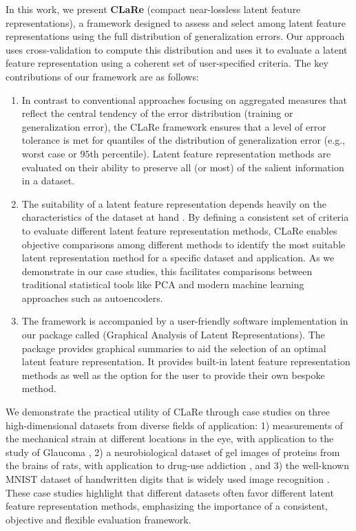 In this work, we present \textbf{CLaRe} (compact near-lossless latent feature representations), a framework designed to assess and select among latent feature representations using the full distribution of generalization errors.
Our approach uses cross-validation to compute this distribution and uses it to evaluate a latent feature representation using a coherent set of user-specified criteria.
The key contributions of our framework are as follows:
\begin{enumerate}
    \item In contrast to conventional approaches focusing on aggregated measures that reflect the central tendency of the error distribution (training or generalization error), the CLaRe framework ensures that a level of error tolerance is met for quantiles of the distribution of generalization error (e.g., worst case or $95$th percentile). Latent feature representation methods are evaluated on their ability to preserve all (or most) of the salient information in a dataset.
    \item The suitability of a latent feature representation depends heavily on the characteristics of the dataset at hand \parencite[Section 3, pp. 325--328]{morris_functional_2015}.
    By defining a consistent set of criteria to evaluate different latent feature representation methods, CLaRe enables objective comparisons among different methods to identify the most suitable latent representation method for a specific dataset and application.
    As we demonstrate in our case studies, this facilitates comparisons between traditional statistical tools like PCA and modern machine learning approaches such as autoencoders.
    \item The framework is accompanied by a user-friendly software implementation in our  package called  (Graphical Analysis of Latent Representations).
    The package provides graphical summaries to aid the selection of an optimal latent feature representation.
    It provides built-in latent feature representation methods as well as the option for the user to provide their own bespoke method.
\end{enumerate}
We demonstrate the practical utility of CLaRe through case studies on three high-dimensional datasets from diverse fields of application: 1) measurements of the mechanical strain at different locations in the eye, with application to the study of Glaucoma \parencite{lee_bayesian_2019}, 2) a neurobiological dataset of gel images of proteins from the brains of rats, with application to drug-use addiction \parencite{morris_pinnacle_2008}, and 3) the well-known MNIST dataset of handwritten digits that is widely used image recognition \parencite{lecun_mnist_1998}.
These case studies highlight that different datasets often favor different latent feature representation methods, emphasizing the importance of a consistent, objective and flexible evaluation framework.


